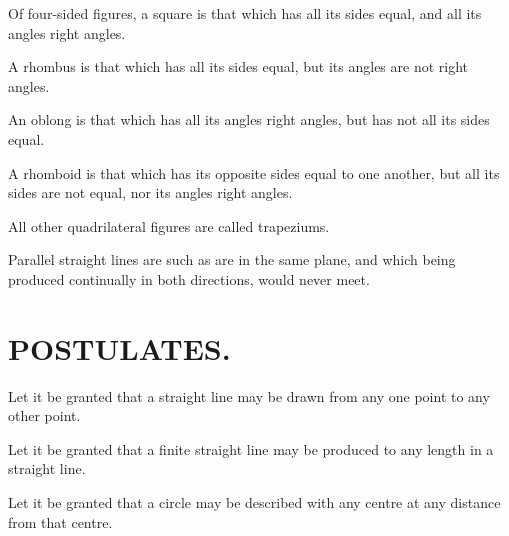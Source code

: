 \begin{bizarrelist}
			\item Of four-sided figures, a square is that which has all its sides equal, and all its angles right angles.                        \label{def30}
			\item A rhombus is that which has all its sides equal, but its angles are not right angles.                         \label{def31}
			\item An oblong is that which has all its angles right angles, but has not all its sides equal.                          \label{def32}
			\item A rhomboid is that which has its opposite sides equal to one another, but all its sides are not equal, nor its angles right angles.                           \label{def33}
			\item All other quadrilateral figures are called trapeziums.                           \label{def34}
			\item Parallel straight lines are such as are in the same plane, and which being produced continually in both directions, would never meet.                            \label{def35}
		\end{bizarrelist}
		{\centering\section{POSTULATES.}
		\label{section\thesection}}
		\begin{bizarrelist}
			\item Let it be granted that a straight line may be drawn from any one point to any other point.\label{post1}
			\item Let it be granted that a finite straight line may be produced to any length in a straight line. \label{post2}
			\item Let it be granted that a circle may be described with any centre at any distance from that centre.  \label{post3}
		\end{bizarrelist}
		
